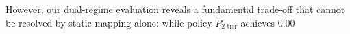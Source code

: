 \documentclass[journal,10pt,onecolumn]{IEEEtran}
\begin{document}
However, our dual-regime evaluation reveals a fundamental trade-off that cannot be resolved by static mapping alone: while policy $P_{2\text{-tier}}$ achieves 0.00%
\end{document}
